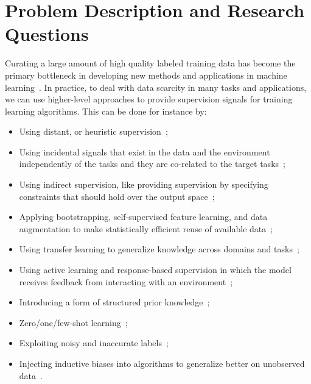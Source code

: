 \section{Problem Description and Research Questions}
Curating a large amount of high quality labeled training data has become the primary bottleneck in developing new methods and applications in machine learning~\citep{Ratner:2016}. 
In practice, to deal with data scarcity in many tasks and applications, we can use higher-level approaches to provide supervision signals for training learning algorithms. 
This can be done for instance by:
\begin{itemize}
\setlength\itemsep{0em}
\item 
Using distant, or heuristic supervision~\citep{Deriu2016:SemEval,Severyn:2015:SemEval, Dehghani:2016:SIGIR, dehghani:2018:ICLR, Dehghani:2017:nips_metalearn, Ratner:2016,Rekatsinas:2017,Varma:2017};
%
\item
Using incidental signals that exist in the data and the environment independently of the tasks and they are co-related to the target tasks~\citep{roth2017incidental}; 
%
\item
Using indirect supervision, like providing supervision by specifying constraints that should hold over the output space~\citep{stewart2017label, clarke2010driving};
%
\item
Applying bootstrapping, self-supervised feature learning, and data augmentation to make statistically efficient reuse of available data~\citep{cubuk2018autoaugment, dosovitskiy2016discriminative,donahue2016adversarial};
%
\item
Using transfer learning to generalize knowledge across domains and tasks~\citep{Ruder:2019};
%
\item
Using active learning and response-based supervision in which the model receives feedback from interacting with an environment~\citep{clarke2010driving,riezler2014response};
%
\item
Introducing a form of structured prior knowledge~\citep{Dehghani:CIKM2016:long,Dehghani:2016:ICTIR};
%
\item
Zero/one/few-shot learning~\citep{vinyals2016matching,finn2017model,snell2017prototypical,socher2013zero};
%
\item
Exploiting noisy and inaccurate labels~\citep{Vahdat:2017, Lee:2013,Hinton:2015,Brodley:1999,reed2014training, Patrini:2016, patrini2016loss,malach2017decoupling};
%
\item
Injecting inductive biases into algorithms to generalize better on unobserved data~\citep{cohen2016group, cohen2016steerable, Dehghani:ICLR:2019}.
\end{itemize}

